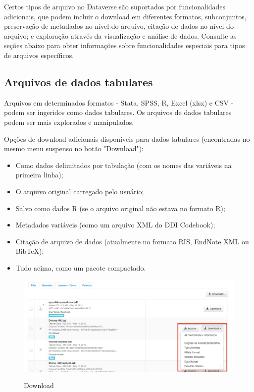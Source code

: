 \documentclass[12pt,hidelinks]{article}
\begin{document}
\qquad Certos tipos de arquivo no Dataverse são suportados por funcionalidades adicionais, que podem incluir o download em diferentes formatos, subconjuntos, preservação de metadados no nível do arquivo, citação de dados no nível do arquivo; e exploração através da visualização e análise de dados. Consulte as seções abaixo para obter informações sobre funcionalidades especiais para tipos de arquivos específicos.

    \subsection{Arquivos de dados tabulares}
    
\qquad Arquivos em determinados formatos - Stata, SPSS, R, Excel (xlsx) e CSV - podem ser ingeridos como dados tabulares. Os arquivos de dados tabulares podem ser mais explorados e manipulados.

Opções de download adicionais disponíveis para dados tabulares (encontradas no mesmo menu suspenso no botão "Download"):

\begin{itemize}

   \item Como dados delimitados por tabulação (com os nomes das variáveis na primeira linha);
   \item O arquivo original carregado pelo usuário;
   \item Salvo como dados R (se o arquivo original não estava no formato R);
   \item Metadados variáveis (como um arquivo XML do DDI Codebook);
   \item Citação de arquivo de dados (atualmente no formato RIS, EndNote XML ou BibTeX);
   \item Tudo acima, como um pacote compactado.

\end{itemize}
    
\begin{figure}[H]
\caption{Download}
                \centering
             \includegraphics[scale=0.3]{imagens/dttab.png}
            \label{Tabulares}
        \end{figure}
    
\end{document}
